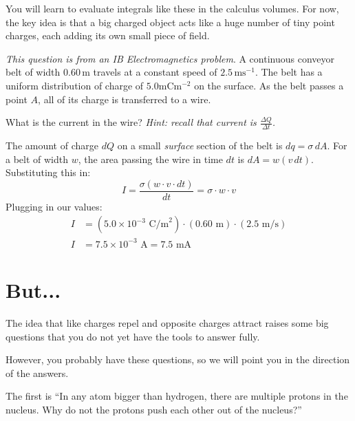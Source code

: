 You will learn to evaluate integrals like these in the calculus volumes.
For now, the key idea is that a big charged object acts like a huge number
of tiny point charges, each adding its own small piece of field.
\begin{Exercise}[title={Belt being charged}, label={ex:current_wire_problem}]

\textit{This question is from an IB Electromagnetics problem}.
A continuous conveyor belt of width $0.60 \, \mathrm m$ travels at a constant speed of $2.5\, \mathrm{m}\mathrm{s}^{-1}$. The belt has a uniform distribution of charge of $5.0 \mathrm{mC}\mathrm{m}^{-2}$ on the surface. As the belt passes a point $A$, all of its charge is transferred to a
wire.

What is the current in the wire?
\textit{Hint: recall that current is $\tfrac{\Delta Q}{\Delta t}$.}
\end{Exercise}

\begin{Answer}[ref={ex:current_wire_problem}]
The amount of charge $dQ$ on a small \emph{surface} section of the belt is $dq = \sigma \, dA$. For a belt of width $w$, the area passing the wire in time $dt$ is $dA = w(v \, dt)$. Substituting this in:
    \begin{equation}
        I = \frac{\sigma (w \cdot v \cdot dt)}{dt} = \sigma \cdot w \cdot v
    \end{equation}
    Plugging in our values:
    \begin{align*}
        I &= (5.0 \times 10^{-3} \text{ C/m}^2) \cdot (0.60 \text{ m}) \cdot (2.5 \text{ m/s}) \\
        I &= 7.5 \times 10^{-3} \text{ A} = 7.5 \text{ mA}
    \end{align*}
\end{Answer}

\section{But...}

The idea that like charges repel and opposite charges attract raises some
big questions that you do not yet have the tools to answer fully.

However, you probably have these questions, so we will point you in the direction
of the answers.

The first is ``In any atom bigger than hydrogen, there are multiple protons in
the nucleus. Why do not the protons push each other out of the nucleus?''

